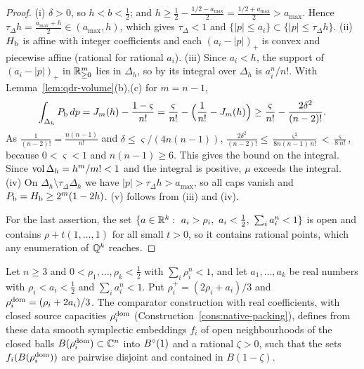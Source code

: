 \begin{proof}
(i) $\delta>0$, so $h<b<\frac12$; and $h\ge\frac12-\frac{1/2-a_{\max}}2=\frac{1/2+a_{\max}}2>a_{\max}$. Hence $\tau_\Delta
h=\frac{a_{\max}+h}2\in(a_{\max},h)$, which gives $\tau_\Delta<1$ and $\{|p|\le a_i\}\subset\{|p|\le\tau_\Delta h\}$. (ii) $H_{\mathrm b}$ is
affine with integer coefficients and each $(a_i-|p|)_+$ is convex and piecewise affine (rational for rational $a_i$). (iii) Since
$a_i<h$, the support of $(a_i-|p|)_+$ in $\mathbb{R}^m_{\ge0}$ lies in $\Delta_h$, so by  its integral
over $\Delta_h$ is $a_i^n/n!$. With Lemma~\ref{lem:qdr-volume}(b),(c) for $m=n-1$,
\[
 \int_{\Delta_h}P_{\mathrm b}\,dp=J_m(h)-\frac{1-\varsigma}{n!}=\frac{\varsigma}{n!}-\Bigl(\frac1{n!}-J_m(h)\Bigr)
 \ge\frac\varsigma{n!}-\frac{2\delta^2}{(n-2)!}.
\]
As $\frac1{(n-2)!}=\frac{n(n-1)}{n!}$ and $\delta\le\varsigma/(4n(n-1))$,
$\frac{2\delta^2}{(n-2)!}\le\frac{\varsigma^2}{8n(n-1)\,n!}<\frac{\varsigma}{8\,n!}$, because $0<\varsigma<1$ and $n(n-1)\ge6$. This
gives the bound on the integral. Since $\operatorname{vol}\Delta_h=h^m/m!<1$ and the integral is positive, $\mu$ exceeds the integral. (iv) On
$\Delta_h\setminus\tau_\Delta\Delta_h$ we have $|p|>\tau_\Delta h>a_{\max}$, so all caps vanish and $P_{\mathrm b}=H_{\mathrm b}\ge2^m(1-2h)$. (v)
follows from (iii) and (iv).

For the last assertion, the set $\{a\in\R^k:\ a_i>\rho_i,\ a_i<\frac12,\ \sum_ia_i^n<1\}$ is open and contains $\rho+t(1,\dots,1)$
for all small $t>0$, so it contains rational points, which any enumeration of $\mathbb{Q}^k$ reaches.
\end{proof}

\begin{theorem}\label{thm:qdr-packing}
Let $n\ge3$ and $0<\rho_1,\dots,\rho_k<\frac12$ with $\sum_i\rho_i^n<1$, and let $a_1,\dots,a_k$ be real numbers with
$\rho_i<a_i<\frac12$ and $\sum_ia_i^n<1$. Put $\rho_i^+=(2\rho_i+a_i)/3$ and $\rho_i^{\rm dom}=(\rho_i+2a_i)/3$. The comparator
construction with real coefficients, with closed source capacities $\rho_i^{\rm dom}$ (Construction~\ref{cons:native-packing}),
defines from these data smooth symplectic embeddings $f_i$ of open neighbourhoods of the closed balls $B(\rho_i^{\rm
dom})\subset\mathbb{C}^n$ into $B^{\circ}(1)$ and a rational $\zeta>0$, such that the sets $f_i(B(\rho_i^{\rm dom}))$ are pairwise disjoint and
contained in $B(1-\zeta)$.
\end{theorem}

